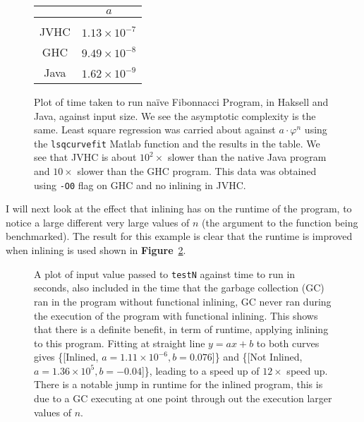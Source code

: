 \documentclass[float=false, crop=false]{standalone}
\newlength\gwidth
\newlength\gheight
\newcommand{\namefig}{\textbf{Figure}~}
\newcommand{\importMGraph}[3]{\setlength{\gwidth}{#2}\setlength{\gheight}{#3}{#1}}
\begin{document}
\begin{figure}
  \centering
  \importMGraph{plotFibRuntime.tex}{0.93\textwidth}{0.4\textwidth}
\begin{tabular}{c | c}
  & $a$\\
  \hline \\
  JVHC & $1.13\times 10^{-7}$\\
  GHC & $9.49\times 10^{-8}$\\
  Java & $1.62 \times 10^{-9}$
\end{tabular}
  \caption[Plot of a comparison between runtime for findin the $n$th Fibonacci number na\"ively as a 
  function of the $n$]
  {Plot of time taken to run na\"ive Fibonnacci Program, in Haksell
  and Java, against input size. We see the asymptotic complexity is the same.
  Least square regression was carried about against $a \cdot \varphi^n$ using the 
  \texttt{lsqcurvefit} Matlab function and the results in the table.
  We see that JVHC is about $10^2 \times$ slower than the native
  Java program and $10\times $ slower than the GHC program.
  This data was obtained using \texttt{-O0} flag on GHC and no inlining
  in JVHC.
}
  \label{plot:fibTiming}
\end{figure}


I will next look at the effect that inlining has on the runtime of the 
program, to notice a large different very large values of $n$ (the 
argument to the function being benchmarked). The result for this
example is clear that the runtime is improved when inlining is used shown in \namefig\ref{plot:inlinePlot}.

\begin{figure}
  \centering
  \importMGraph{inlinePlot}{0.96\textwidth}{0.4\textwidth}
  \caption[Plot of runtime of \texttt{testN} as a function on input size $n$]
  {A plot of input value passed to \texttt{testN} against time to run in seconds,
    also included in the time that the garbage collection (GC) ran in the program without
    functional inlining, GC never ran during the execution of the 
    program with functional inlining. This
  shows that there is a definite benefit, in term of runtime, applying inlining to this
  program. Fitting at straight line $y=ax+b$ to both curves gives 
  \{[Inlined, $a=1.11\times 10^{-6}, b = 0.076$]\} and 
  \{[Not Inlined, $a = 1.36\times 10^{5}, b= -0.04$]\}, leading to a speed up of $12 \times$ speed up.
  There is a notable jump in runtime for the inlined program, this is due to a GC 
  executing at one point through out the execution larger values of $n$. }
  \label{plot:inlinePlot}

\end{figure}
\end{document}
